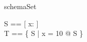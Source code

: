 \begin{zsection}
\SECTION schemaSet
\end{zsection}

\begin{zed} 
   S == [ x: \nat ] 
\\
   T == \{ S | x = 10 @ \theta S \}
\end{zed}